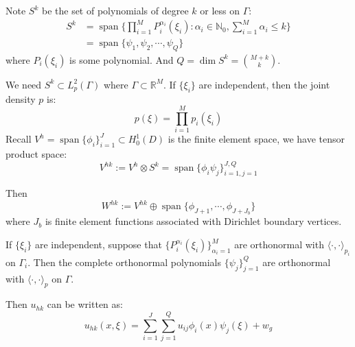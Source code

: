 \begin{definition}
    Note $S^k$ be the set of polynomials of degree $k$ or less on $\Gamma$:
    \begin{equation}
        \begin{aligned}
            S^k &= \operatorname{span}\{\prod_{i=1}^{M}P_i^{\alpha_i}(\xi_i): \alpha_i\in \mathbb{N}_0, \sum_{i=1}^{M}\alpha_i\leq k\}\\
            &= \operatorname{span}\{\psi_1, \psi_2, \cdots, \psi_Q\}
        \end{aligned}
    \end{equation}
    where $P_i(\xi_i)$ is some polynomial. And $Q=\operatorname{dim}S^k = \binom{M+k}{k}$.
\end{definition}
We need $S^k\subset L^2_p(\Gamma)$ where $\Gamma \subset \mathbb{R}^M$. If $\{\xi_i\}$ are independent, then the joint density $p$ is:
\begin{equation}
    p(\xi) = \prod_{i=1}^{M}p_i(\xi_i)
\end{equation}
Recall $V^h=\operatorname{span}\{\phi_i\}_{i=1}^{J}\subset H^1_0(D)$ is the finite element space, we have tensor product space:
\begin{equation}
    V^{hk}:= V^h\otimes S^k = \operatorname{span}\{\phi_i\psi_j\}_{i=1, j=1}^{J,Q}
\end{equation}

Then 
\begin{equation}
    W^{hk}:=V^{hk}\oplus \operatorname{span}\{\phi_{J+1},\cdots, \phi_{J+J_{b}}\}
\end{equation}
where $J_b$ is finite element functions associated with Dirichlet boundary vertices.

\begin{theorem}
    If $\{\xi_i\}$ are independent, suppose that $\{P_i^{\alpha_i}(\xi_i)\}_{\alpha_i=1}^{M}$ are orthonormal with $\langle\cdot,\cdot\rangle_{p_i}$ on $\Gamma_i$.
    Then the complete orthonormal polynomials $\{\psi_j\}_{j=1}^{Q}$ are orthonormal with $\langle\cdot,\cdot\rangle_p$ on $\Gamma$.
\end{theorem}

Then $u_{hk}$ can be written as:
\begin{equation}
    u_{hk}(x, \xi) = \sum_{i=1}^{J}\sum_{j=1}^{Q}u_{ij}\phi_i(x)\psi_j(\xi)+w_g
\end{equation}

